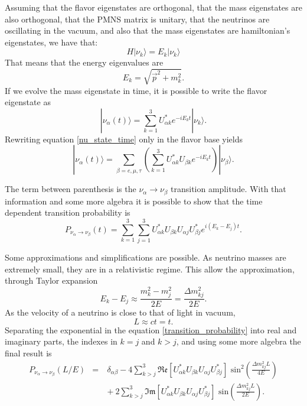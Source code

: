 Assuming that the flavor eigenstates are orthogonal, that the mass eigenstates are also orthogonal, that the PMNS matrix is unitary, that the neutrinos are oscillating in the vacuum, and also that the mass eigenstates are hamiltonian's eigenstates, we have that:
%
\begin{equation}
	H|\nu_k \rangle = E_k |\nu_k \rangle
	\label{nu_schrodinger}
\end{equation}
%
That means that the energy eigenvalues are
%
\begin{equation}
	E_k = \sqrt{\vec{p}^2 + m_k^2}.
	\label{nu_energy}
\end{equation}
%
If we evolve the mass eigenstate in time, it is possible to write the flavor eigenstate as
%
\begin{equation}
	|\nu_\alpha (t) \rangle = \sum_{k=1}^3 U^*_{\alpha k} e^{-iE_kt}|\nu_k \rangle.
	\label{nu_state_time}
\end{equation}
%
Rewriting equation \ref{nu_state_time} only in the flavor base yields 
%
\begin{equation}
	|\nu_\alpha (t)\rangle = \sum_{\beta = e, \mu, \tau} \left( \sum_{k=1}^3 U^*_{\alpha k} U_{\beta k} e^{-iE_kt} \right) |\nu_\beta \rangle.
	\label{nu_state_time_2}
\end{equation}
%

The term between parenthesis is the $\nu_\alpha \rightarrow \nu_\beta$ transition amplitude. With that information and some more algebra it is possible to show that the time dependent transition probability is
\begin{equation}
	P_{\nu_\alpha \rightarrow \nu_\beta}(t) = \sum_{k=1}^3 \sum_{j=1}^3 U^*_{\alpha k} U_{\beta k} U_{\alpha j} U^*_{\beta j} e^{i(E_k - E_j)t}.
	\label{transition_probability}
\end{equation}

Some approximations and simplifications are possible. As neutrino masses are extremely small, they are in a relativistic regime. This allow the approximation, through Taylor expansion 
%
\begin{equation}
	E_k - E_j \approx \frac{m^2_k - m^2_j}{2E} = \frac{\Delta m^2_{kj}}{2E}.
	\label{nu_Ej-Ek}
\end{equation}
%
As the velocity of a neutrino is close to that of light in vacuum,
%
\begin{equation}
	L \approx ct = t.
	\label{nu_L}
\end{equation}
%
Separating the exponential in the equation \ref{transition_probability} into real and imaginary parts, the indexes in $k=j$ and $k>j$, and using some more algebra the final result is
%
\begin{eqnarray}
	P_{\nu_\alpha \rightarrow \nu_\beta} (L/E) & = & \delta_{\alpha\beta} - 4\sum_{k>j}^3  \mathfrak{Re}[U^*_{\alpha k} U_{\beta k} U_{\alpha j} U^*_{\beta j}]\text{ sin}^2\left(\frac{\Delta m^2_{kj} L}{4E} \right) \nonumber \\
	& \quad & + \ 2\sum_{k>j}^3\mathfrak{Im}[U^*_{\alpha k} U_{\beta k} U_{\alpha j} U^*_{\beta j}]\text{ sin}\left(\frac{\Delta m^2_{kj} L}{2E} \right).
	\label{nu_oscillation_final}
\end{eqnarray}
%

